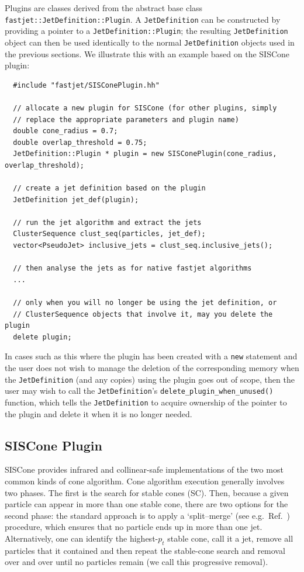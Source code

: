 \documentclass[12pt,a4]{article}
\newcommand{\ttt}[1]{{\small\texttt{#1}}}
\begin{document}
Plugins are classes derived from the abstract base class
\ttt{fastjet::JetDefinition::Plugin}.
%
A \ttt{JetDefinition} can be constructed by providing a pointer to a
\ttt{JetDefinition::Plugin}; the resulting \ttt{JetDefinition} object
can then be used identically to the normal \ttt{JetDefinition} objects
used in the previous sections.
%
We illustrate this with an example based on the SISCone plugin:
\begin{lstlisting}
  #include "fastjet/SISConePlugin.hh"

  // allocate a new plugin for SISCone (for other plugins, simply
  // replace the appropriate parameters and plugin name)
  double cone_radius = 0.7;
  double overlap_threshold = 0.75;
  JetDefinition::Plugin * plugin = new SISConePlugin(cone_radius, overlap_threshold);

  // create a jet definition based on the plugin
  JetDefinition jet_def(plugin);

  // run the jet algorithm and extract the jets
  ClusterSequence clust_seq(particles, jet_def);
  vector<PseudoJet> inclusive_jets = clust_seq.inclusive_jets();

  // then analyse the jets as for native fastjet algorithms
  ...

  // only when you will no longer be using the jet definition, or
  // ClusterSequence objects that involve it, may you delete the plugin
  delete plugin;
\end{lstlisting}
%
In cases such as this where the plugin has been created with a
\ttt{new} statement and the user does not wish to manage the deletion
of the corresponding memory when the \ttt{JetDefinition} (and any
copies) using the plugin goes out of scope, then the user may wish to
call the \ttt{JetDefinition}'s \ttt{delete\_plugin\_when\_unused()}
function, which tells the \ttt{JetDefinition} to acquire ownership of
the pointer to the plugin and delete it when it is no longer needed.


\subsection{SISCone Plugin}
\label{sec:siscone-plugin}

SISCone provides infrared and collinear-safe implementations of the
two most common kinds of cone algorithm.
%
Cone algorithm execution generally involves two phases.
%
The first is the search for stable cones (SC).
%
Then, because a given particle can appear in more than one stable
cone, there are two options for the second phase: the standard
approach is to apply a
`split--merge' (see e.g.\ Ref.\ \cite{RunII-jet-physics}) procedure,
which ensures that no particle ends up in more than one jet.
%
Alternatively, one can identify the highest-$p_t$ stable cone, call it a jet,
remove all particles that it contained and then repeat the stable-cone
search and removal over and over until no particles remain (we call
this progressive removal).
\end{document}
